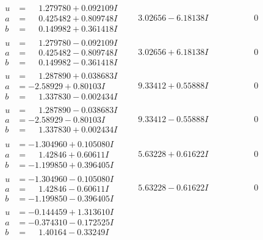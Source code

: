 \documentclass[1p]{elsarticle_modified}
\theoremstyle{definition}
\begin{document}
$$\begin{array}{c|c|c}
\begin{aligned}
u &= \phantom{-}1.279780 + 0.092109 I \\
a &= \phantom{-}0.425482 + 0.809748 I \\
b &= \phantom{-}0.149982 + 0.361418 I\end{aligned}
 & \phantom{-}3.02656 - 6.18138 I & \phantom{-0.000000 } 0 \\ \hline\begin{aligned}
u &= \phantom{-}1.279780 - 0.092109 I \\
a &= \phantom{-}0.425482 - 0.809748 I \\
b &= \phantom{-}0.149982 - 0.361418 I\end{aligned}
 & \phantom{-}3.02656 + 6.18138 I & \phantom{-0.000000 } 0 \\ \hline\begin{aligned}
u &= \phantom{-}1.287890 + 0.038683 I \\
a &= -2.58929 + 0.80103 I \\
b &= \phantom{-}1.337830 - 0.002434 I\end{aligned}
 & \phantom{-}9.33412 + 0.55888 I & \phantom{-0.000000 } 0 \\ \hline\begin{aligned}
u &= \phantom{-}1.287890 - 0.038683 I \\
a &= -2.58929 - 0.80103 I \\
b &= \phantom{-}1.337830 + 0.002434 I\end{aligned}
 & \phantom{-}9.33412 - 0.55888 I & \phantom{-0.000000 } 0 \\ \hline\begin{aligned}
u &= -1.304960 + 0.105080 I \\
a &= \phantom{-}1.42846 + 0.60611 I \\
b &= -1.199850 + 0.396405 I\end{aligned}
 & \phantom{-}5.63228 + 0.61622 I & \phantom{-0.000000 } 0 \\ \hline\begin{aligned}
u &= -1.304960 - 0.105080 I \\
a &= \phantom{-}1.42846 - 0.60611 I \\
b &= -1.199850 - 0.396405 I\end{aligned}
 & \phantom{-}5.63228 - 0.61622 I & \phantom{-0.000000 } 0 \\ \hline\begin{aligned}
u &= -0.144459 + 1.313610 I \\
a &= -0.374310 - 0.172525 I \\
b &= \phantom{-}1.40164 - 0.33249 I\end{aligned}

\end{array}$$
\end{document}
